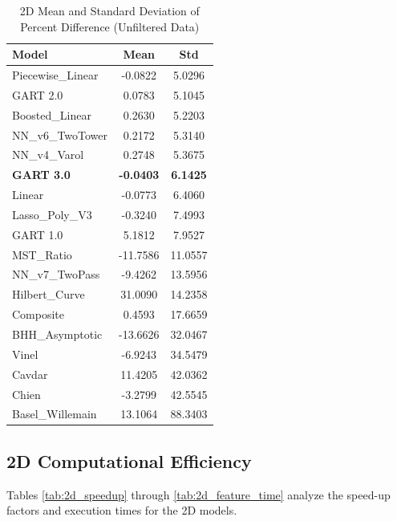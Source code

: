 \documentclass[11pt, a4paper]{article}
\begin{document}
\begin{table}[H]
    \centering
    \caption{2D Mean and Standard Deviation of Percent Difference (Unfiltered Data)}
    \label{tab:2d_unfiltered}
    \begin{tabular}{lS[table-format=3.4]S[table-format=3.4]}
        \toprule
        \textbf{Model} & {\textbf{Mean}} & {\textbf{Std}} \\
        \midrule
        Piecewise\_Linear & -0.0822 & 5.0296 \\
        GART 2.0 & 0.0783 & 5.1045 \\
        Boosted\_Linear & 0.2630 & 5.2203 \\
        NN\_v6\_TwoTower & 0.2172 & 5.3140 \\
        NN\_v4\_Varol & 0.2748 & 5.3675 \\
        \textbf{GART 3.0} & \textbf{-0.0403} & \textbf{6.1425} \\
        Linear & -0.0773 & 6.4060 \\
        Lasso\_Poly\_V3 & -0.3240 & 7.4993 \\
        GART 1.0 & 5.1812 & 7.9527 \\
        MST\_Ratio & -11.7586 & 11.0557 \\
        NN\_v7\_TwoPass & -9.4262 & 13.5956 \\
        Hilbert\_Curve & 31.0090 & 14.2358 \\
        Composite & 0.4593 & 17.6659 \\
        BHH\_Asymptotic & -13.6626 & 32.0467 \\
        Vinel & -6.9243 & 34.5479 \\
        Cavdar & 11.4205 & 42.0362 \\
        Chien & -3.2799 & 42.5545 \\
        Basel\_Willemain & 13.1064 & 88.3403 \\
        \bottomrule
    \end{tabular}
\end{table}

\subsection{2D Computational Efficiency}

Tables \ref{tab:2d_speedup} through \ref{tab:2d_feature_time} analyze the speed-up factors and execution times for the 2D models.
\end{document}
